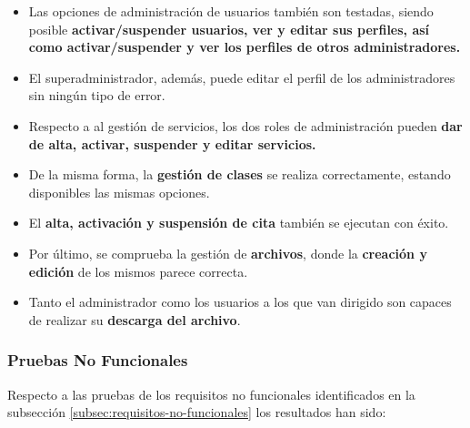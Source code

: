 \begin{itemize}
\item Las opciones de administración de usuarios también son testadas, siendo posible \textbf{activar/suspender usuarios, ver y editar sus perfiles, así como activar/suspender y ver los perfiles de otros administradores.}
\item El superadministrador, además, puede editar el perfil de los administradores sin ningún tipo de error.
\item Respecto a al gestión de servicios, los dos roles de administración pueden \textbf{dar de alta, activar, suspender y editar servicios.}
\item De la misma forma, la \textbf{gestión de clases} se realiza correctamente, estando disponibles las mismas opciones.
\item El \textbf{alta, activación y suspensión de cita} también se ejecutan con éxito.
\item Por último, se comprueba la gestión de \textbf{archivos}, donde la \textbf{creación y edición} de los mismos parece correcta.
\item Tanto el administrador como los usuarios a los que van dirigido son capaces de realizar su \textbf{descarga del archivo}.
\end{itemize}

\subsubsection{Pruebas No Funcionales}

Respecto a las pruebas de los requisitos no funcionales identificados en la subsección \ref{subsec:requisitos-no-funcionales} los resultados han sido:

